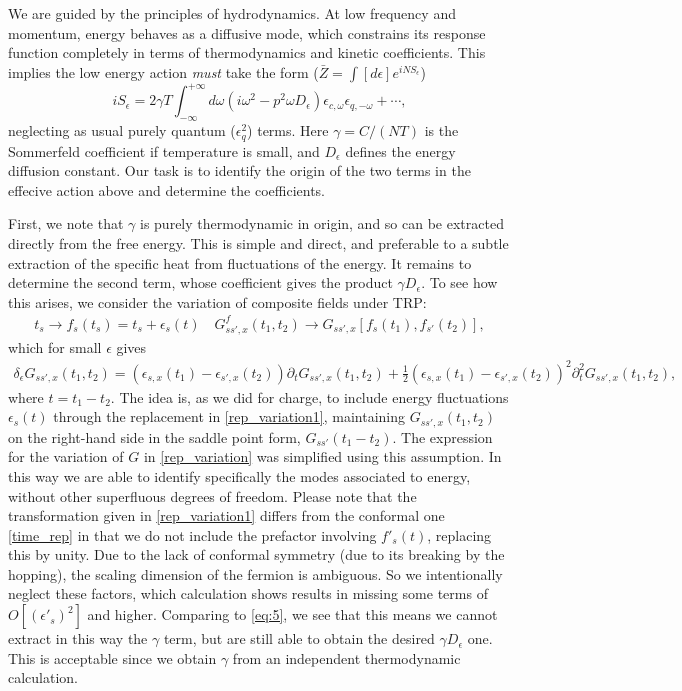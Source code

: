 \documentclass[twocolumn,floatfix,superscriptaddress]{revtex4-1}
\begin{document}
\begin{widetext}
We are guided by the principles of hydrodynamics.  At low frequency and momentum, energy behaves as a diffusive mode, which constrains its response function completely in terms of thermodynamics and kinetic coefficients.  This implies the low energy action {\em must} take the form ($\bar Z=\int [d\epsilon] e^{iNS_\epsilon}$)
\begin{equation}
  \label{eq:5}
iS_\epsilon  =2 \gamma T\int_{-\infty}^{+\infty} d\omega (i\omega^2-p^2 \omega D_{\epsilon} )\epsilon_{c,\omega}\epsilon_{q,-\omega} + \cdots,
\end{equation}
neglecting as usual purely quantum ($\epsilon_q^2$) terms.  Here $\gamma = C/(NT)$ is the Sommerfeld coefficient if temperature is small, and $D_\epsilon$ defines the energy diffusion constant.  Our task is to identify the origin of the two terms in the effecive action above and determine the coefficients.  

First, we note that $\gamma$ is purely thermodynamic in origin, and so can be extracted directly from the free energy.  This is simple and direct, and preferable to a subtle extraction of the specific heat from fluctuations of the energy.  It remains to determine the second term, whose coefficient gives the product $\gamma D_\epsilon$.  To see how this arises, we consider the variation of composite fields under TRP:
 \begin{eqnarray}
 \label{rep_variation1}
t_s\rightarrow  f_s(t_s)=t_s+\epsilon_s(t)\quad G_{ss',x}^f(t_1,t_2)\rightarrow G_{ss',x}[f_s(t_1),f_{s'}(t_2)],
 \end{eqnarray}
which for small $\epsilon$ gives 
\begin{eqnarray}
 \label{rep_variation}
\delta_\epsilon G_{ss',x}(t_1,t_2)=(\epsilon_{s,x}(t_1)-\epsilon_{s',x}(t_2))\partial_tG_{ss',x}(t_1,t_2)+\frac{1}{2}(\epsilon_{s,x}(t_1)-\epsilon_{s',x}(t_2))^2 \partial_t^2 G_{ss',x}(t_1,t_2),
 \end{eqnarray}
where $t=t_1-t_2$.  The idea is, as we did for charge, to include energy fluctuations $\epsilon_s(t)$ through the replacement in \eqref{rep_variation1}, maintaining $G_{ss',x}(t_1,t_2)$ on the right-hand side in the saddle point form, $G_{ss'}(t_1-t_2)$.  The expression for the variation of $G$ in \eqref{rep_variation} was simplified using this assumption.  In this way we are able to identify specifically the modes associated to energy, without other superfluous degrees of freedom.  Please note that the transformation given in \eqref{rep_variation1} differs from the conformal one \eqref{time_rep} in that we do not include the prefactor involving $f'_s(t)$, replacing this by unity.  Due to the lack of conformal symmetry (due to its breaking by the hopping), the scaling dimension of the fermion is ambiguous.  So we intentionally neglect these factors, which calculation shows results in missing some terms of $O[(\epsilon'_s)^2]$ and higher.  Comparing to \eqref{eq:5}, we see that this means we cannot extract in this way the $\gamma$ term, but are still able to obtain the desired $\gamma D_\epsilon$ one.  This is acceptable since we obtain $\gamma$ from an independent thermodynamic calculation.


\end{widetext}
\end{document}
